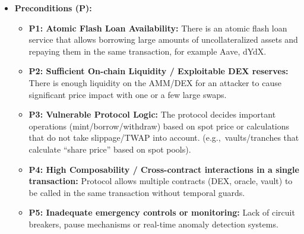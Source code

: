 \begin{itemize}
    \item \textbf{Preconditions (P):}
    \begin{itemize}
        \item \textbf{P1: Atomic Flash Loan Availability:} There is an atomic flash loan service that allows borrowing large amounts of uncollateralized assets and repaying them in the same transaction, for example Aave, dYdX.
        \item \textbf{P2: Sufficient On-chain Liquidity / Exploitable DEX reserves:} There is enough liquidity on the AMM/DEX for an attacker to cause significant price impact with one or a few large swaps. \cite{werner2022sok}
        \item \textbf{P3: Vulnerable Protocol Logic:} The protocol decides important operations (mint/borrow/withdraw) based on spot price or calculations that do not take slippage/TWAP into account. (e.g.,\ vaults/tranches that calculate “share price” based on spot pools). \cite{harvest2021}
        \item \textbf{P4: High Composability / Cross-contract interactions in a single transaction:} Protocol allows multiple contracts (DEX, oracle, vault) to be called in the same transaction without temporal guards.\cite{werapun2023faa}
        \item \textbf{P5: Inadequate emergency controls or monitoring:} Lack of circuit breakers, pause mechanisms or real-time anomaly detection systems.\cite{alhaidari2025protecting}
    \end{itemize}


\end{itemize}
